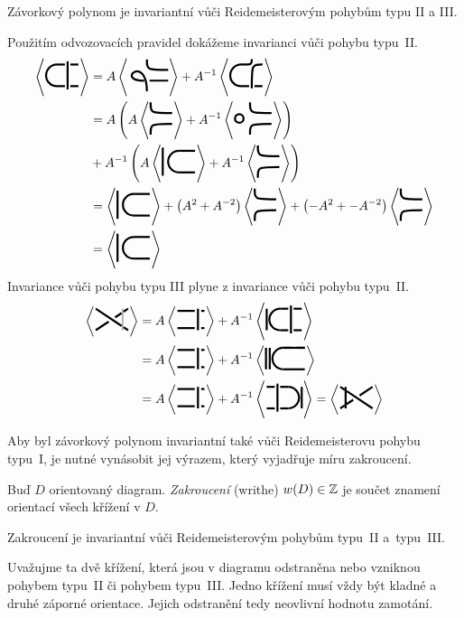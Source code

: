 \begin{tvrz}\label{t01:3}
Závorkový polynom je invariantní vůči Reidemeisterovým pohybům typu II a III.
\end{tvrz}
\begin{dukaz}
Použitím odvozovacích pravidel dokážeme invarianci vůči pohybu typu~II.
\begin{equation*}
\begin{split}
\left< \reiddva \right> & = A \left< \FO \right> + A^{-1} \left< \BO \right> \\ & = A \left( A \left< \DO \right> + A^{-1} \left< \EO \right> \right) \\ & + A^{-1} \left( A \left< \CO \right> +  A^{-1} \left< \DO \right> \right) \\ & = \left< \CO \right> + \left( A^2 + A^{-2} \right) \left< \DO \right> + \left( -A^2 + -A^{-2} \right) \left< \DO \right>  \\ & = \left< \CO \right>
\end{split}
\end{equation*}
Invariance vůči pohybu typu III plyne z invariance vůči pohybu typu~II.
\begin{equation*}
\begin{split}
\left< \GO \right> & = A \left< \JO \right>+  A^{-1} \left< \IO \right> \\ & = A \left< \JO \right> + A^{-1} \left< \KO \right>  \\ & = A \left< \JO \right> + A^{-1} \left< \LO \right> = \left< \HO \right>
\end{split}
\end{equation*}
\end{dukaz}

Aby byl závorkový polynom invariantní také vůči Reidemeisterovu pohybu typu~I, je nutné vynásobit jej výrazem, který vyjadřuje míru zakroucení.

\begin{definice}\label{def01:3}
Buď $D$ orientovaný diagram. \emph{Zakroucení} (writhe) $w(D) \in \mathbb{Z}$ je součet znamení orientací všech křížení v $D$.
\end{definice}

\begin{lemma}\label{l01:4}
Zakroucení je invariantní vůči Reidemeisterovým pohybům typu~II a~typu~III.
\end{lemma}
\begin{dukaz}
Uvažujme ta dvě křížení, která jsou v diagramu odstraněna nebo vzniknou pohybem typu~II či pohybem typu~III. Jedno křížení musí vždy být kladné a druhé záporné orientace. Jejich odstranění tedy neovlivní hodnotu zamotání.
\end{dukaz}

